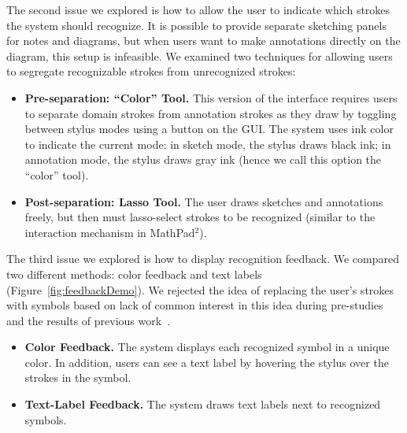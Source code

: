 \documentclass{elsart}
\begin{document}

The second issue we explored is how to allow the user to indicate
which strokes the system should recognize.  It is possible to provide
separate sketching panels for notes and diagrams, but when users want
to make annotations directly on the diagram, this setup is infeasible.
We examined two techniques for allowing users to segregate
recognizable strokes from unrecognized strokes:

\begin{itemize}
\item \textbf{Pre-separation: ``Color'' Tool.} This version of the
  interface requires users to separate domain strokes from
  annotation strokes as they draw by toggling between stylus
  modes using a button on the GUI.  The system uses ink color to indicate the
  current mode: in sketch mode, the stylus draws black ink; in
  annotation mode, the stylus draws gray ink (hence we call this
  option the ``color'' tool).
\item \textbf{Post-separation: Lasso Tool.} The user draws sketches
  and annotations freely, but then must lasso-select strokes to be
  recognized (similar to the interaction mechanism in
  MathPad$^{2}$\cite{LaViola2006Initial}).  
\end{itemize}

The third issue we explored is how to display recognition feedback.
We compared two different methods: color feedback and text labels
(Figure~\ref{fig:feedbackDemo}).  We rejected the idea of replacing
the user's strokes with symbols based on lack of common interest in
this idea during pre-studies and the results of previous
work~\cite{Hong2002Sketch}.

\begin{itemize}
\item \textbf{Color Feedback.} The system displays each recognized
symbol in a unique color.  In addition, users can see a text label by
hovering the stylus over the strokes in the symbol.  
\item \textbf{Text-Label Feedback.}  The system draws text labels next
to recognized symbols.
\end{itemize}
\end{document}
